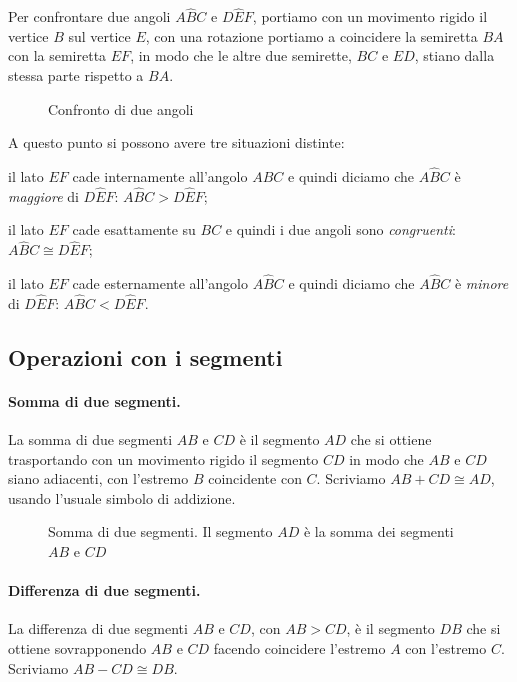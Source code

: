 Per confrontare due angoli $A\widehat{B}C$ e $D\widehat{E}F$, portiamo con un movimento rigido il vertice $B$ sul vertice $E$, con una rotazione portiamo a coincidere la semiretta $BA$ con la semiretta $EF$, in modo che le altre due semirette, $BC$ e $ED$, stiano dalla stessa parte rispetto a $BA$.

\begin{figure}[htb]
\centering
\caption{Confronto di due angoli}
\end{figure}

A questo punto si possono avere tre situazioni distinte:
\begin{itemize*}
\item il lato $EF$ cade internamente all'angolo $A\widehat{B}C$ e quindi diciamo che $A\widehat{B}C$ è \emph{maggiore} di $D\widehat{E}F$: $A\widehat{B}C>D\widehat{E}F$;
\item il lato $EF$ cade esattamente su $BC$ e quindi i due angoli sono \emph{congruenti}: $A\widehat{B}C\cong D\widehat{E}F$;
\item il lato $EF$ cade esternamente all'angolo $A\widehat{B}C$ e quindi diciamo che $A\widehat{B}C$ è \emph{minore} di $D\widehat{E}F$: $A\widehat{B}C<D\widehat{E}F$.
\end{itemize*}

\subsection{Operazioni con i segmenti}

\paragraph{Somma di due segmenti.} La somma di due segmenti $AB$ e $CD$ è il segmento $AD$ che si ottiene trasportando con un movimento rigido il segmento $CD$ in modo che $AB$ e $CD$ siano adiacenti, con l'estremo $B$ coincidente con $C$. Scriviamo $AB + CD \cong AD$, usando l'usuale simbolo di addizione.

\begin{figure}[htb]
\centering
\caption{Somma di due segmenti. Il segmento $AD$ è la somma dei segmenti $AB$ e $CD$}
\end{figure}

\paragraph{Differenza di due segmenti.} La differenza di due segmenti $AB$ e $CD$, con $AB>CD$, è il segmento $DB$ che si ottiene sovrapponendo $AB$ e $CD$ facendo coincidere l'estremo $A$ con l'estremo $C$. Scriviamo $AB-CD \cong DB$.

